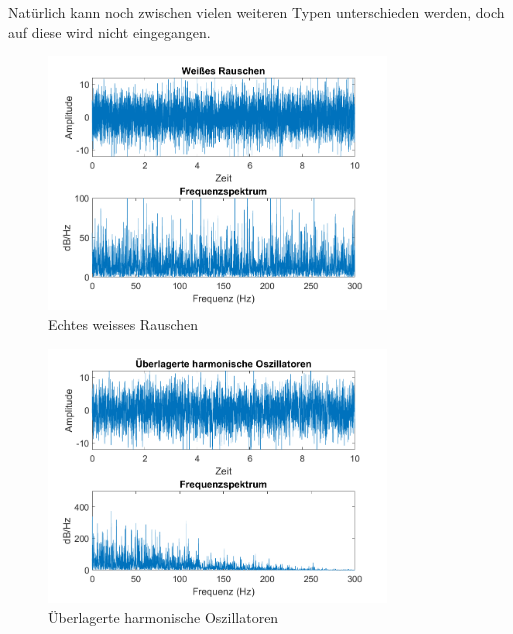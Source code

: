 Natürlich kann noch zwischen vielen weiteren Typen unterschieden werden, doch auf diese wird nicht eingegangen.



\begin{figure}
	\centering
	\includegraphics[width=0.8\textwidth]{papers/brown/images/weissesRauschen-FFT.png}
	\caption{Echtes weisses Rauschen}
	\label{brown:weissesRauschenSignal}
\end{figure}

\begin{figure}	
	\centering
	\includegraphics[width=0.8\textwidth]{papers/brown/images/harmonischeOszillatoren-FFT.png}
	\caption{Überlagerte harmonische Oszillatoren}
	\label{brown:überlagerteSchwingungen}
\end{figure}


